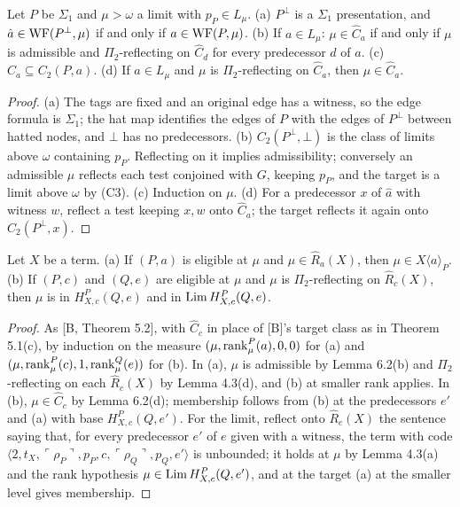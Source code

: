 \documentclass[11pt]{article}
\begin{document}
\begin{statement} Let $P$ be $\Sigma_1$ and $\mu > \omega$ a limit with $p_P \in L_\mu$. (a)
$P^\bot$ is a $\Sigma_1$ presentation, and $\hat a \in \mathrm{WF}(P^\bot,\mu)$ if and only if $a \in \mathrm{WF}(P,\mu)$. (b) If $a \in L_\mu$: $\mu \in \widehat C_a$ if and only if $\mu$
is admissible and $\Pi_2$-reflecting on $\widehat C_d$ for every predecessor $d$ of $a$. (c) $\widehat C_a \subseteq
C_2(P,a)$. (d) If $a \in L_\mu$ and $\mu$ is $\Pi_2$-reflecting on $\widehat C_a$, then $\mu \in \widehat C_a$.
\end{statement}

\begin{proof}
(a) The tags are fixed and an original edge has a witness, so the edge formula is $\Sigma_1$; the hat map identifies
the edges of $P$ with the edges of $P^\bot$ between hatted nodes, and $\bot$ has no predecessors. (b) $C_2(P^\bot,\bot)$ is the class of
limits above $\omega$ containing $p_P$. Reflecting on it implies admissibility; conversely an admissible $\mu$ reflects
each test conjoined with $G$, keeping $p_P$, and the target is a limit above $\omega$ by (C3). (c) Induction on $\mu$.
(d) For a predecessor $x$ of $\hat a$ with witness $w$, reflect a test keeping $x, w$ onto $\widehat C_a$; the target
reflects it again onto $C_2(P^\bot, x)$.
\end{proof}

\begin{statement} Let $X$ be a term. (a) If $(P,a)$ is eligible at $\mu$ and $\mu \in
\widehat R_a(X)$, then $\mu \in X\langle a\rangle_P$. (b) If $(P,c)$ and $(Q,e)$ are eligible at $\mu$ and $\mu$ is
$\Pi_2$-reflecting on $\widehat R_c(X)$, then $\mu$ is in $H^P_{X,c}(Q,e)$ and in $\mathrm{Lim}\, H^P_{X,c}(Q,e)$.
\end{statement}

\begin{proof}
As [B, Theorem 5.2], with $\widehat C_c$ in place of [B]'s target class as in Theorem 5.1(c), by induction on the measure
$(\mu, \mathrm{rank}^P_\mu(a), 0, 0)$ for (a) and $(\mu, \mathrm{rank}^P_\mu(c), 1, \mathrm{rank}^Q_\mu(e))$ for (b). In (a), $\mu$ is admissible
by Lemma 6.2(b) and $\Pi_2$-reflecting on each $\widehat R_c(X)$ by Lemma 4.3(d), and (b) at smaller rank applies. In
(b), $\mu \in \widehat C_c$ by Lemma 6.2(d); membership follows from (b) at the predecessors $e'$ and (a) with base
$H^P_{X,c}(Q,e')$. For the limit, reflect onto $\widehat R_c(X)$ the sentence saying that, for every predecessor $e'$ of
$e$ given with a witness, the term with code $\langle 2, t_X, \ulcorner\rho_P\urcorner, p_P, c,
\ulcorner\rho_Q\urcorner, p_Q, e'\rangle$ is unbounded; it holds at $\mu$ by Lemma 4.3(a) and the rank hypothesis $\mu
\in \mathrm{Lim}\, H^P_{X,c}(Q,e')$, and at the target (a) at the smaller level gives membership.
\end{proof}
\end{document}
